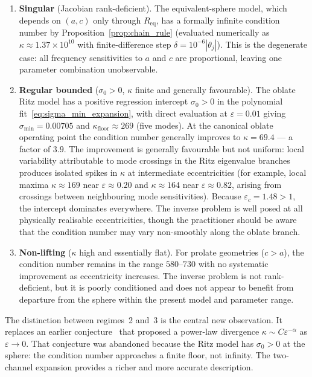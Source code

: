 \begin{enumerate}
  \item \textbf{Singular} (Jacobian rank-deficient).  The equivalent-sphere
  model, which depends on $(a,c)$ only through $R_\mathrm{eq}$, has a
  formally infinite condition number by Proposition~\ref{prop:chain_rule}
  (evaluated numerically as $\kappa \approx 1.37 \times 10^{10}$ with
  finite-difference step $\delta = 10^{-6}|\theta_j|$).  This is the
  degenerate case: all frequency
  sensitivities to $a$ and $c$ are proportional, leaving one parameter
  combination unobservable.

  \item \textbf{Regular bounded} ($\sigma_0 > 0$, $\kappa$ finite and
  generally favourable).  The oblate Ritz model has a positive regression
  intercept $\sigma_0 > 0$ in the polynomial fit~\eqref{eq:sigma_min_expansion},
  with direct evaluation at $\varepsilon = 0.01$ giving
  $\sigma_{\min} = 0.00705$ and
  $\kappa_\mathrm{floor} \approx 269$ (five modes).  At the canonical oblate operating point
  the condition number generally improves to $\kappa = 69.4$
  --- a factor of $3.9$.  The improvement is generally favourable but not
  uniform: local variability attributable to mode crossings in the Ritz eigenvalue
  branches produces isolated spikes in $\kappa$ at intermediate eccentricities
  (for example, local maxima $\kappa \approx 169$ near $\varepsilon \approx 0.20$
  and $\kappa \approx 164$ near $\varepsilon \approx 0.82$, arising from
  crossings between neighbouring mode sensitivities).
  Because $\varepsilon_c = 1.48 > 1$, the intercept
  dominates everywhere.  The inverse problem is well posed at all
  physically realisable eccentricities, though the practitioner should be aware
  that the condition number may vary non-smoothly along the oblate branch.

  \item \textbf{Non-lifting} ($\kappa$ high and essentially flat).  For
  prolate geometries ($c > a$), the condition number remains in the range
  $580$--$730$ with no systematic improvement as eccentricity increases.
  The inverse problem is not rank-deficient, but it is poorly conditioned
  and does not appear to benefit from departure from the sphere within the
  present model and parameter range.
\end{enumerate}

The distinction between regimes~2 and~3 is the central new observation.
It replaces an earlier conjecture~\cite[Conjecture~1, first
draft]{BrowntoneCompanion} that proposed a power-law divergence
$\kappa \sim C\varepsilon^{-\alpha}$ as $\varepsilon \to 0$.  That
conjecture was abandoned because the Ritz model has $\sigma_0 > 0$ at the
sphere: the condition number approaches a finite floor, not infinity.  The
two-channel expansion provides a richer and more accurate description.

